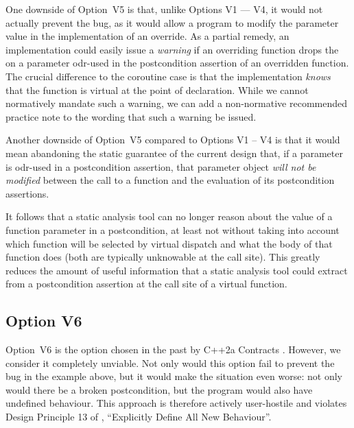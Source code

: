 One downside of Option~V5 is that, unlike Options V1 --- V4, it would not actually prevent the bug, as it would allow a program to modify the parameter value in the implementation of an override. As a partial remedy, an implementation could easily issue a \emph{warning} if an overriding function drops the  on a parameter odr-used in the postcondition assertion of an overridden function. The crucial difference to the coroutine case is that the implementation \emph{knows} that the function is virtual at the point of declaration. While we cannot normatively mandate such a warning, we can add a non-normative recommended practice note to the wording that such a warning be issued. 

Another downside of Option~V5 compared to Options V1 -- V4 is that it would mean abandoning the static guarantee of the current \cite{P2900R10} design that, if a parameter is odr-used in a postcondition assertion, that parameter object \emph{will not be modified} between the call to a function and the evaluation of its postcondition assertions.

It follows that a static analysis tool can no longer reason about the value of a function parameter in a postcondition, at least not without taking into account which function will be selected by virtual dispatch and what the body of that function does (both are typically unknowable at the call site). This greatly reduces the amount of useful information that a static analysis tool could extract from a postcondition assertion at the call site of a virtual function.

\subsection*{Option V6}

Option~V6 is the option chosen in the past by C++2a Contracts \cite{P0542R5}. However, we consider it completely unviable. Not only would this option fail to prevent the bug in the example above, but it would make the situation even worse: not only would there be a broken postcondition, but the program would also have undefined behaviour. This approach is therefore actively user-hostile and violates Design Principle 13 of \cite{P2900R10}, ``Explicitly Define All New Behaviour''.

